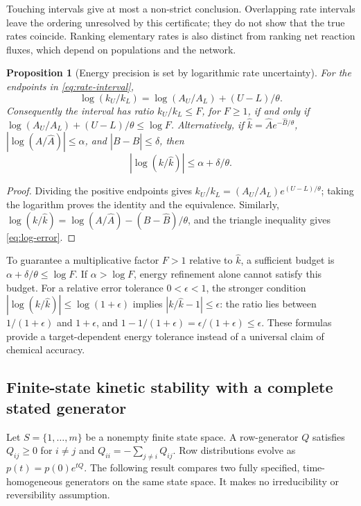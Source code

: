 \documentclass[11pt,a4paper]{article}
\theoremstyle{plain}
\newtheorem{proposition}[theorem]{Proposition}
\theoremstyle{definition}
\theoremstyle{remark}
\begin{document}
Touching intervals give at most a non-strict conclusion. Overlapping rate
intervals leave the ordering unresolved by this certificate; they do not
show that the true rates coincide. Ranking elementary rates is also distinct
from ranking net reaction fluxes, which depend on populations and the network.

\begin{proposition}[Energy precision is set by logarithmic rate uncertainty]
\label{prop:log-budget}
For the endpoints in \eqref{eq:rate-interval},
\begin{equation}
 \log(k_U/k_L)=\log(A_U/A_L)+(U-L)/\theta.
 \label{eq:log-width}
\end{equation}
Consequently the interval has ratio $k_U/k_L\le F$, for $F\ge1$, if and
only if
$\log(A_U/A_L)+(U-L)/\theta\le\log F$.
Alternatively, if $\widehat k=\widehat A e^{-\widehat B/\theta}$,
$|\log(A/\widehat A)|\le\alpha$, and
$|B-\widehat B|\le\delta$, then
\begin{equation}
 |\log(k/\widehat k)|\le\alpha+\delta/\theta.
 \label{eq:log-error}
\end{equation}
\end{proposition}
\begin{proof}
Dividing the positive endpoints gives
$k_U/k_L=(A_U/A_L)e^{(U-L)/\theta}$; taking the logarithm proves the
identity and the equivalence. Similarly,
$\log(k/\widehat k)=\log(A/\widehat A)-(B-\widehat B)/\theta$,
and the triangle inequality gives \eqref{eq:log-error}.
\end{proof}

To guarantee a multiplicative factor $F>1$ relative to $\widehat k$, a
sufficient budget is $\alpha+\delta/\theta\le\log F$.
If $\alpha>\log F$, energy refinement alone cannot satisfy this budget.
For a relative error tolerance $0<\epsilon<1$, the stronger condition
$|\log(k/\widehat k)|\le\log(1+\epsilon)$ implies
$|k/\widehat k-1|\le\epsilon$: the ratio lies between
$1/(1+\epsilon)$ and $1+\epsilon$, and
$1-1/(1+\epsilon)=\epsilon/(1+\epsilon)\le\epsilon$.
These formulas provide a target-dependent energy tolerance instead of a
universal claim of chemical accuracy.

\subsection{Finite-state kinetic stability with a complete stated generator}
Let $S=\{1,\ldots,m\}$ be a nonempty finite state space. A row-generator
$Q$ satisfies $Q_{ij}\ge0$ for $i\ne j$ and
$Q_{ii}=-\sum_{j\ne i}Q_{ij}$. Row distributions evolve as
$p(t)=p(0)e^{tQ}$. The following result compares two fully specified,
time-homogeneous generators on the same state space. It makes no
irreducibility or reversibility assumption.
\end{document}
